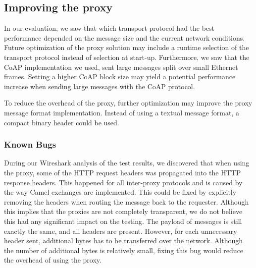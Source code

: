 \subsection{Improving the proxy}

In our evaluation, we saw that which transport protocol had the best performance
depended on the message size and the current network conditions. Future
optimization of the proxy solution may include a runtime selection of
the transport protocol instead of selection at start-up. Furthermore, we saw
that the CoAP implementation we used, sent large messages split over small
Ethernet frames. Setting a higher CoAP block size may yield a potential
performance increase when sending large messages with the CoAP protocol.

To reduce the overhead of the proxy, further optimization may improve the proxy
message format implementation. Instead of using a textual message format, a
compact binary header could be used.

\subsubsection{Known Bugs}

During our Wireshark analysis of the test results, we discovered that when using
the proxy, some of the HTTP request headers was propagated into the HTTP
response headers. This happened for all inter-proxy protocols and is caused by
the way Camel exchanges are implemented. This could be fixed by explicitly
removing the headers when routing the message back to the requester. Although
this implies that the proxies are not completely transparent, we do not believe
this had any significant impact on the testing. The payload of messages is still
exactly the same, and all headers are present. However, for each unnecessary
header sent, additional bytes has to be transferred over the network. Although
the number of additional bytes is relatively small, fixing this bug would reduce
the overhead of using the proxy.
